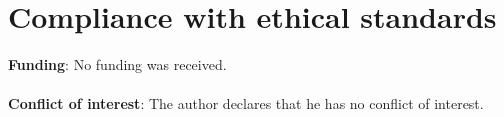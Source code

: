 %

\section*{Compliance with ethical standards}

        {\bf Funding}: No funding was received.\\
        \\
        {\bf Conflict of interest}: The author declares that he has no conflict of interest.


%



